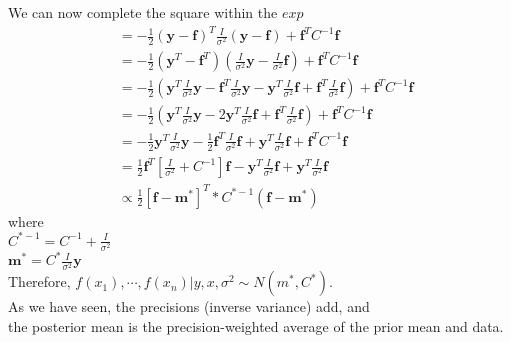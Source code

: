 \documentclass{homework}
\newcommand{\1}{\mathbf{1}}
\begin{document}
\begin{enumerate}[label=(\Alph*)]
We can now complete the square within the $exp$
\begin{equation} \begin{split}
&= -\frac{1}{2}( \textbf{y} - \textbf{f})^T \frac{I}{\sigma^2}(\textbf{y} - \textbf{f}) + \textbf{f}^TC^{-1} \textbf{f}\\
&= -\frac{1}{2}( \textbf{y}^T - \textbf{f}^T) (\frac{I}{\sigma^2}\textbf{y} - \frac{I}{\sigma^2}\textbf{f}) + \textbf{f}^TC^{-1} \textbf{f}\\
&= -\frac{1}{2}( \textbf{y}^T\frac{I}{\sigma^2}\textbf{y}  - \textbf{f}^T\frac{I}{\sigma^2}\textbf{y} - \textbf{y}^T\frac{I}{\sigma^2}\textbf{f} + \textbf{f}^T\frac{I}{\sigma^2}\textbf{f}) + \textbf{f}^TC^{-1} \textbf{f}\\
&= -\frac{1}{2}( \textbf{y}^T\frac{I}{\sigma^2}\textbf{y}  - 2 \textbf{y}^T\frac{I}{\sigma^2}\textbf{f} + \textbf{f}^T\frac{I}{\sigma^2}\textbf{f}) + \textbf{f}^TC^{-1} \textbf{f}\\
&= -\frac{1}{2}\textbf{y}^T\frac{I}{\sigma^2}\textbf{y}  - \frac{1}{2}\textbf{f}^T\frac{I}{\sigma^2}\textbf{f} + \textbf{y}^T\frac{I}{\sigma^2}\textbf{f} +  \textbf{f}^TC^{-1} \textbf{f}\\
&= \frac{1}{2}\textbf{f}^T[ \frac{I}{\sigma^2} + C^{-1}]\textbf{f}  - \textbf{y}^T\frac{I}{\sigma^2}\textbf{f}  + \textbf{y}^T\frac{I}{\sigma^2}\textbf{f}\\
&\propto \frac{1}{2}[ \textbf{f} - \textbf{m}^* ]^T * C^{* - 1}(\textbf{f} - \textbf{m}^*)
\end{split} \end{equation}
where\\
$C^{* - 1} = C^{-1} + \frac{I}{\sigma^2} $\\
$ \textbf{m}^* = C^{*} \frac{I}{\sigma^2} \textbf{y}$\\
Therefore, $f(x_1),\cdots,f(x_n)| y , x ,\sigma^2 \sim N(m^*,C^*)$. \\
As we have seen, the precisions (inverse variance) add, and \\the posterior mean is the precision-weighted average of the prior mean and data.



\end{enumerate}
\end{document}
